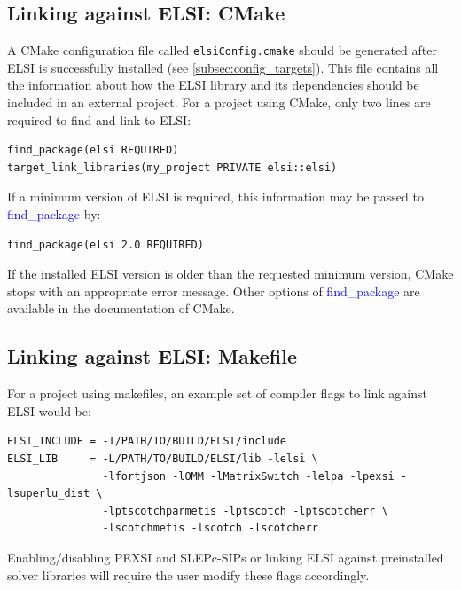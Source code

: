 \documentclass{report}
\begin{document}
\subsection{Linking against ELSI:  CMake}
\label{subsec:import_cmake}
A CMake configuration file called \texttt{elsiConfig.cmake} should be generated after ELSI is successfully installed (see \ref{subsec:config_targets}).  This file contains all the information about how the ELSI library and its dependencies should be included in an external project.  For a project using CMake, only two lines are required to find and link to ELSI:\\

\begin{verbatim}
find_package(elsi REQUIRED)
target_link_libraries(my_project PRIVATE elsi::elsi)
\end{verbatim}

If a minimum version of ELSI is required, this information may be passed to \textcolor{blue}{find\_package} by:\\

\begin{verbatim}
find_package(elsi 2.0 REQUIRED)
\end{verbatim}

If the installed ELSI version is older than the requested minimum version, CMake stops with an appropriate error message.  Other options of \textcolor{blue}{find\_package} are available in the documentation of CMake.\\

\subsection{Linking against ELSI:  Makefile}
\label{subsec:import_makefile}
For a project using makefiles, an example set of compiler flags to link against ELSI would be:\\

\begin{verbatim}
ELSI_INCLUDE = -I/PATH/TO/BUILD/ELSI/include
ELSI_LIB     = -L/PATH/TO/BUILD/ELSI/lib -lelsi \
               -lfortjson -lOMM -lMatrixSwitch -lelpa -lpexsi -lsuperlu_dist \
               -lptscotchparmetis -lptscotch -lptscotcherr \
               -lscotchmetis -lscotch -lscotcherr
\end{verbatim}

Enabling/disabling PEXSI and SLEPc-SIPs or linking ELSI against preinstalled solver libraries will require the user modify these flags accordingly.\\
\end{document}
